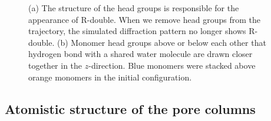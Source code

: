 \documentclass[journal=jpcbfk,manuscript=article]{achemso}
\begin{document}
\begin{figure}[!htb]
\begin{subfigure}{0.45\textwidth}
  \caption{}\label{fig:hbond_visualization}
  \end{subfigure}
  \caption{(a) The structure of the head groups is responsible for the appearance of
  R-double. When we remove head groups from the trajectory, the simulated 
  diffraction pattern no longer shows R-double. (b) Monomer head groups above or below
  each other that hydrogen bond with a shared water molecule are drawn closer
  together in the $z$-direction. Blue monomers were stacked above orange monomers in the
  initial configuration. 
  }\label{fig:hbonds}
  \end{figure}
  
  \subsection{Atomistic structure of the pore columns}
\end{document}
